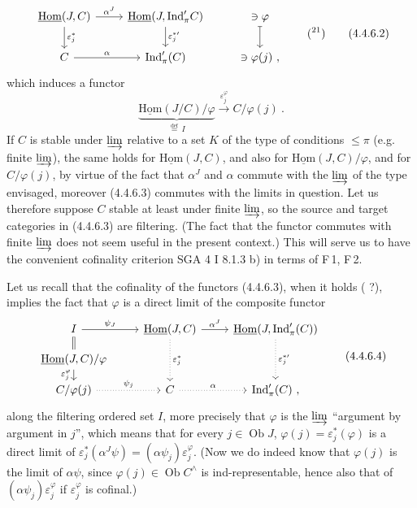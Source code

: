 \documentclass[11pt]{article}
\newcommand{\printedpage}[1]{\marginpar{\footnotesize p.~#1}}
\newcommand{\msp}[1]{\marginpar{\footnotesize [#1]}}
\newcommand{\uHom}{\underline{\mathrm{Hom}}}
\newcommand{\Ind}{\mathrm{Ind}}
\newcommand{\Ob}{\operatorname{Ob}}
\begin{document}
\printedpage{19}

\msp{page 84}
\[
\begin{tikzcd}
\uHom(J,C) \arrow[r, "\alpha^J"] \arrow[d, "\varepsilon_j^*"] & \uHom(J,\Ind'_\pi C) \arrow[d, "{\varepsilon_j^{*\prime}}"] & \ni \varphi \arrow[d, mapsto] \\
C \arrow[r, "\alpha"] & \Ind'_\pi(C) & \ni \varphi(j)\ ,
\end{tikzcd}
\qquad (\text{\footnotemark[21]})
\tag*{(4.4.6.2)}
\]
which induces a functor
\[
\underbrace{\uHom(J/C)/\varphi}_{\overset{\text{def}}{=}\, I} \xrightarrow{\varepsilon_j^\varphi} C/\varphi(j)\ . \tag*{(4.4.6.3)} %
\]
If $C$ is stable under $\varinjlim$ relative to a set $K$ of the type of conditions $\leqslant \pi$ (e.g. finite $\varinjlim$), the same holds for $\uHom(J,C)$, and also for $\uHom(J,C)/\varphi$, and for $C/\varphi(j)$, by virtue of the fact that $\alpha^J$ and $\alpha$ commute with the $\varinjlim$ of the type envisaged, moreover (4.4.6.3) commutes with the limits in question. Let us therefore suppose $C$ stable at least under finite $\varinjlim$, so the source and target categories in (4.4.6.3) are filtering. (The fact that the functor commutes with finite $\varinjlim$ does not seem useful in the present context.) This will serve us to have the convenient cofinality criterion SGA 4 I 8.1.3 b) in terms of F\,1, F\,2.

\msp{page 85}
Let us recall that the cofinality of the functors (4.4.6.3), when it holds ( ?), implies the fact that $\varphi$ is a direct limit of the composite functor
\[
\begin{tikzcd}[row sep=small]
I \arrow[r, "\psi_J"] \arrow[d, equal] & \uHom(J,C) \arrow[r, "\alpha^J"] \arrow[dd, dotted, "\varepsilon_j^*"] & \uHom(J,\Ind'_\pi(C)) \arrow[dd, dotted, "{\varepsilon_j^{*\prime}}"] \\
\uHom(J,C)/\varphi \arrow[d, "\varepsilon_j^\varphi"'] & & \\
C/\varphi(j) \arrow[r, dotted, "\psi_j"] & C \arrow[r, dotted, "\alpha"] & \Ind'_\pi(C)\ ,
\end{tikzcd}
\tag*{(4.4.6.4)}
\]
along the filtering ordered set $I$, more precisely that $\varphi$ is the $\varinjlim$ ``argument by argument in $j$'', which means that for every $j \in \Ob J$, $\varphi(j) = \varepsilon_j^*(\varphi)$ is a direct limit of $\varepsilon_j^*(\alpha^J\psi) = (\alpha\psi_j)\varepsilon_j^\varphi$. (Now we do indeed know that $\varphi(j)$ is the limit of $\alpha\psi$, since $\varphi(j) \in \Ob C^\wedge$ is ind-representable, hence also that of $(\alpha\psi_j)\varepsilon_j^\varphi$ if $\varepsilon_j^\varphi$ is cofinal.)
\end{document}
